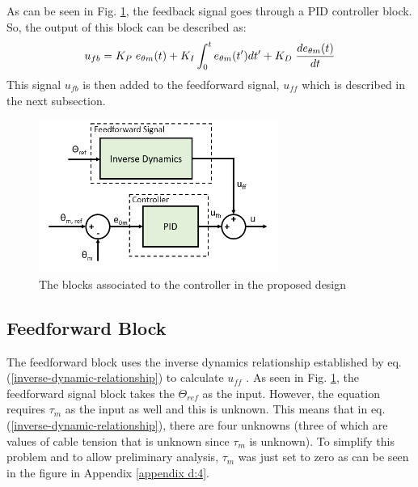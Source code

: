 \documentclass[a4paper,12pt]{report}
\begin{document}
As can be seen in Fig. \ref{controller-BD}, the feedback signal goes through a PID controller block. So, the output of this block can be described as:
\begin{equation}
u_{fb}=K_P\hspace{1mm}e_{\theta m}(t) + K_I\int_{0}^{t}e_{\theta m}(t')dt' + K_D \hspace{1mm}\dfrac{de_{\theta m}(t)}{dt}
\end{equation}
This signal $u_{fb} $ is then added to the feedforward signal, $ u_{ff} $ which is described in the next subsection.
\begin{figure}[H]
	\centering
	\includegraphics[width=0.7\textwidth]{images/Controller.png}
	\caption{The blocks associated to the controller in the proposed design}
	\label{controller-BD}
\end{figure}

\subsection{Feedforward Block}

The feedforward block uses the inverse dynamics relationship established by eq. (\ref{inverse-dynamic-relationship}) to calculate $ u_{ff} $ . As seen in Fig. \ref{controller-BD}, the feedforward signal block takes the $ \Theta_{ref} $ as the input. However, the equation requires $ \tau_m $ as the input as well and this is unknown. This means that in eq. (\ref{inverse-dynamic-relationship}), there are four unknowns (three of which are values of cable tension that is unknown since $ \tau_m $ is unknown). To simplify this problem and to allow preliminary analysis, $ \tau_m $ was just set to zero as can be seen in the figure in Appendix \ref{appendix d:4}.
\end{document}
